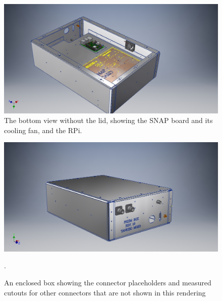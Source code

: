\begin{figure}	
	\centering
	\includegraphics[width=\linewidth]{"Figures/Bottom Open"}
	\caption{The bottom view without the lid, showing the SNAP board and its cooling fan, and the RPi.} 
	\label{Fig:Bottom Open}
\end{figure}	

\begin{figure}
	\centering
	\includegraphics[width=\linewidth]{Figures/Enclosed}
	\caption{An enclosed box showing the connector placeholders and measured cutouts for other connectors that are not shown in this rendering}.	\label{Fig:Enclosed}
\end{figure}
